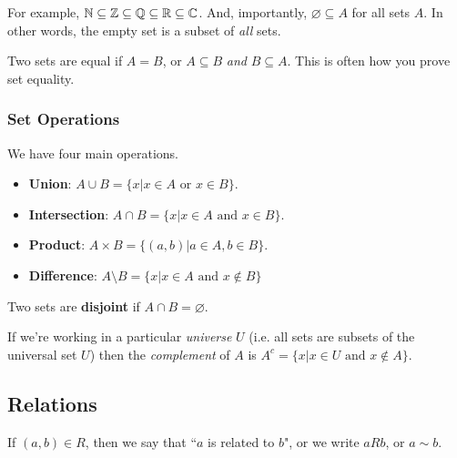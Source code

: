\documentclass[12pt]{article}
\begin{document}

For example, ${\mathbb N} \subseteq {\mathbb Z} \subseteq {\mathbb Q} \subseteq {\mathbb R} \subseteq {\mathbb C}$. And,
importantly, $\varnothing \subseteq A$ for all sets $A$. In other words, the
empty set is a subset of {\it all} sets.

Two sets are equal if $A = B$, or $A \subseteq B$ {\it and} $B \subseteq A$.
This is often how you prove set equality.

\subsubsection{Set Operations}

We have four main operations.

\begin{itemize}
	\item {\bf Union}: $A \cup B = \{x | x \in A \text{ or } x \in B \}$.
	\item {\bf Intersection}: $A \cap B = \{ x | x \in A \text{ and } x \in B \}$.
	\item {\bf Product}: $A \times B = \{(a, b) | a \in A, b \in B \}$.
	\item {\bf Difference}: $A \setminus B = \{x | x \in A \text{ and } x \not\in B\}$
\end{itemize}

Two sets are {\bf disjoint} if $A \cap B = \varnothing$.

If we're working in a particular {\it universe} $U$ (i.e. all sets are subsets
of the universal set $U$) then the {\it complement} of $A$ is $A^c = \{x | x
	\in U \text{ and } x \not\in A \}$.

\subsection{Relations}


If $(a, b) \in R$, then we say that ``$a$ is related to $b$", or we write
$aRb$, or $a \sim b$.
\end{document}
